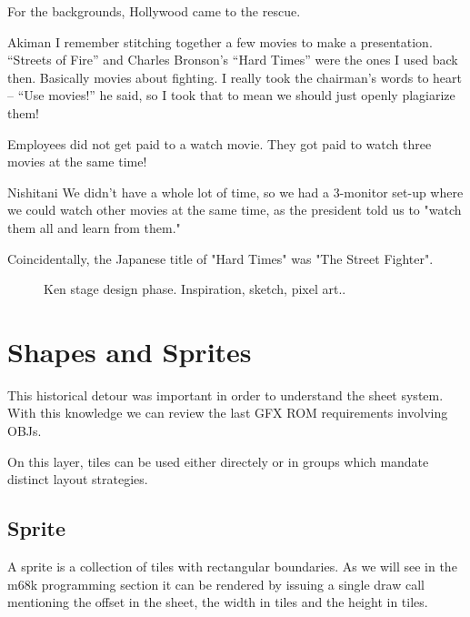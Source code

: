 
For the backgrounds, Hollywood came to the rescue.

\begin{q}{Akiman\cite{ffdevinterview}}
I remember stitching together a few movies to make a presentation. “Streets of Fire” and Charles Bronson’s “Hard Times” were the ones I used back then. Basically movies about fighting. I really took the chairman’s words to heart – “Use movies!” he said, so I took that to mean we should just openly plagiarize them!
\end{q}

Employees did not get paid to a watch movie. They got paid to watch three movies at the same time!

\begin{q}{Nishitani\cite{ffdevinterview}}
We didn't have a whole lot of time, so we had a 3-monitor set-up where we could watch other movies at the same time, as the president told us to "watch them all and learn from them."
\end{q}

\begin{trivia}
Coincidentally, the Japanese title of "Hard Times" was "The Street Fighter".
\end{trivia}

 \begin{figure}[H]
\caption*{Ken stage design phase. Inspiration, sketch, pixel art.\cite{sf2completefiles}.}
\end{figure}

\section{Shapes and Sprites}
This historical detour was important in order to understand the sheet system. With this knowledge we can review the last GFX ROM requirements involving OBJs.  

On this layer, tiles can be used either directely or in groups which mandate distinct layout strategies.

\subsection{Sprite}
A sprite is a collection of tiles with rectangular boundaries. As we will see in the m68k programming section it can be rendered by issuing a single draw call mentioning the offset in the sheet, the width in tiles and the height in tiles.

